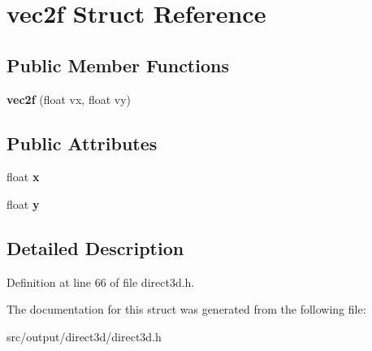 \hypertarget{structvec2f}{\section{vec2f Struct Reference}
\label{structvec2f}
}
\subsection*{Public Member Functions}
\begin{DoxyCompactItemize}
\item 
\hypertarget{structvec2f_a915600f7812e74f6836f2d563a785084}{{\bfseries vec2f} (float vx, float vy)}\label{structvec2f_a915600f7812e74f6836f2d563a785084}

\end{DoxyCompactItemize}
\subsection*{Public Attributes}
\begin{DoxyCompactItemize}
\item 
\hypertarget{structvec2f_a6b17e4442fdc15a98727c8002a9a1bac}{float {\bfseries x}}\label{structvec2f_a6b17e4442fdc15a98727c8002a9a1bac}

\item 
\hypertarget{structvec2f_ab10800546a1f4186877e2fe9a7488e74}{float {\bfseries y}}\label{structvec2f_ab10800546a1f4186877e2fe9a7488e74}

\end{DoxyCompactItemize}


\subsection{Detailed Description}


Definition at line 66 of file direct3d.\-h.



The documentation for this struct was generated from the following file\-:\begin{DoxyCompactItemize}
\item 
src/output/direct3d/direct3d.\-h\end{DoxyCompactItemize}
